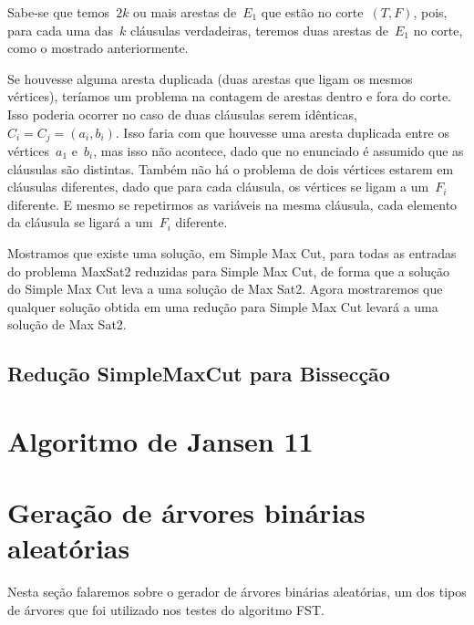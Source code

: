 \documentclass[a4paper,12pt]{article}
\begin{document}
		Sabe-se que temos~$2k$ ou mais arestas de~$E_1$ que estão no
		corte~$(T,F)$, pois, para cada uma das~$k$ cláusulas
		verdadeiras, teremos duas arestas de~$E_1$ no corte, como
		o mostrado anteriormente.

		Se houvesse alguma aresta duplicada (duas arestas que ligam
		os mesmos vértices), teríamos um problema na contagem de
		arestas dentro e fora do corte.
		Isso poderia ocorrer no caso de duas cláusulas serem 
		idênticas,~${C_i=C_j=(a_i,b_i)}$.
		Isso faria com que houvesse uma aresta duplicada entre
		os vértices~$a_1$ e~$b_i$, mas isso não acontece, dado que
		no enunciado é assumido que as cláusulas são distintas.
		Também não há o problema de dois vértices estarem em cláusulas
		diferentes, dado que para cada cláusula, os vértices se ligam
		a um~$F_i$ diferente.
		E mesmo se repetirmos as variáveis na mesma cláusula, cada
		elemento da cláusula se ligará a um~$F_i$ diferente.

		\bigskip

		Mostramos que existe uma solução, em Simple Max Cut, 
		para todas as entradas do
		problema MaxSat2 reduzidas para Simple Max Cut, de forma que
		a solução do Simple Max Cut leva a uma solução de Max Sat2.
		Agora mostraremos que qualquer solução obtida em 
		uma redução para Simple Max Cut levará a uma solução de Max Sat2.

	\subsection{Redução SimpleMaxCut para Bissecção}



\section {Algoritmo de Jansen 11}



\newpage

\section {Geração de árvores binárias aleatórias}
	Nesta seção falaremos sobre o gerador de árvores binárias 
	aleatórias, um dos tipos de árvores que foi utilizado nos 
	testes do algoritmo FST.
\end{document}
